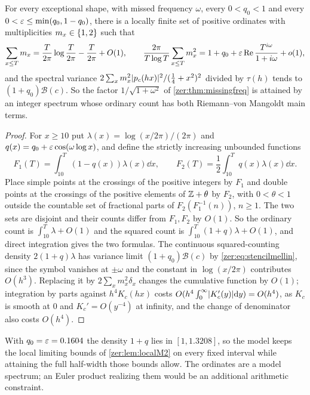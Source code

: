 \begin{proposition}\label{zer:prop:discrete}
For every exceptional shape, with missed frequency $\omega$, every $0<q_0<1$ and every
$0<\varepsilon\le\min(q_0,1-q_0)$, there is a locally finite set of positive ordinates with multiplicities
$m_x\in\{1,2\}$ such that
\[
 \sum_{x\le T}m_x=\frac T{2\pi}\log\frac T{2\pi}-\frac T{2\pi}+O(1),\qquad
 \frac{2\pi}{T\log T}\sum_{x\le T}m_x^2=1+q_0+\varepsilon\operatorname{Re}\frac{T^{i\omega}}{1+i\omega}+o(1),
\]
and the spectral variance $2\sum_xm_x^2\lvert p_c(hx)\rvert^2/(\tfrac14+x^2)^2$ divided by $\tau(h)$ tends to
$(1+q_0)\mathcal B(c)$. So the factor $1/\sqrt{1+\omega^2}$ of \cref{zer:thm:missingfreq} is attained by an
integer spectrum whose ordinary count has both Riemann--von Mangoldt main terms.
\end{proposition}
\begin{proof}
For $x\ge10$ put $\lambda(x)=\log(x/2\pi)/(2\pi)$ and $q(x)=q_0+\varepsilon\cos(\omega\log x)$, and define the strictly
increasing unbounded functions
\[
 F_1(T)=\int_{10}^T(1-q(x))\lambda(x)\dd x,\qquad F_2(T)=\frac12\int_{10}^Tq(x)\lambda(x)\dd x .
\]
Place simple points at the crossings of the positive integers by $F_1$ and double points at the
crossings of the positive elements of $\mathbb{Z}+\theta$ by $F_2$, with $0<\theta<1$ outside the countable set of
fractional parts of $F_2(F_1^{-1}(n))$, $n\ge1$. The two sets are disjoint and their counts differ from
$F_1,F_2$ by $O(1)$. So the ordinary count is $\int_{10}^T\lambda+O(1)$ and the squared count is
$\int_{10}^T(1+q)\lambda+O(1)$, and direct integration gives the two formulas. The continuous
squared-counting density $2(1+q)\lambda$ has variance limit $(1+q_0)\mathcal B(c)$ by
\eqref{zer:eq:stencilmellin}, since the symbol vanishes at $\pm\omega$ and the constant in $\log(x/2\pi)$
contributes $O(h^3)$. Replacing it by $2\sum_xm_x^2\delta_x$ changes the cumulative function by $O(1)$;
integration by parts against $h^4K_c(hx)$ costs $O(h^4\int_0^\infty\lvert K_c'(y)\rvert\mathrm{d} y)=O(h^4)$, as $K_c$ is
smooth at $0$ and $K_c'=O(y^{-4})$ at infinity, and the change of denominator also costs $O(h^4)$.
\end{proof}

With $q_0=\varepsilon=0.1604$ the density $1+q$ lies in $[1,1.3208]$, so the model keeps the local limiting
bounds of \cref{zer:lem:localM2} on every fixed interval while attaining the full half-width those
bounds allow. The ordinates are a model spectrum; an Euler product realizing them would be an
additional arithmetic constraint.

